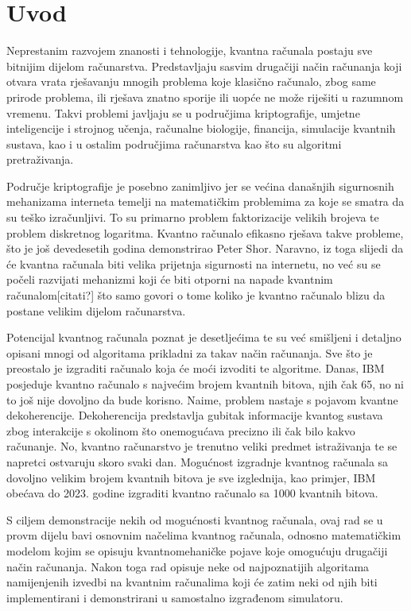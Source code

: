 \chapter{Uvod}
\label{ch:uvod}
Neprestanim razvojem znanosti i tehnologije, kvantna računala postaju sve bitnijim dijelom računarstva. Predstavljaju sasvim drugačiji način računanja koji otvara vrata rješavanju mnogih problema koje klasično računalo, zbog same prirode problema, ili rješava znatno sporije ili uopće ne može riješiti u razumnom vremenu. Takvi problemi javljaju se u područjima kriptografije, umjetne inteligencije i strojnog učenja, računalne biologije, financija, simulacije kvantnih sustava, kao i u ostalim područjima računarstva kao što su algoritmi pretraživanja.

Područje kriptografije je posebno zanimljivo jer se većina današnjih sigurnosnih mehanizama interneta temelji na matematičkim problemima za koje se smatra da su teško izračunljivi. To su primarno problem faktorizacije velikih brojeva te problem diskretnog logaritma. Kvantno računalo efikasno rješava takve probleme, što je još devedesetih godina demonstrirao Peter Shor\citep{Shor:1994jg}. Naravno, iz toga slijedi da će kvantna računala biti velika prijetnja sigurnosti na internetu, no već su se počeli razvijati mehanizmi koji će biti otporni na napade kvantnim računalom[citati?] što  samo govori o tome koliko je kvantno računalo blizu da postane velikim dijelom računarstva.

Potencijal kvantnog računala poznat je desetljećima te su već smišljeni i detaljno opisani mnogi od algoritama prikladni za takav način računanja. Sve što je preostalo je izgraditi računalo koja će moći izvoditi te algoritme. Danas, IBM posjeduje kvantno računalo s najvećim brojem kvantnih bitova, njih čak 65, no ni to još nije dovoljno da bude korisno. Naime, problem nastaje s pojavom kvantne dekoherencije. Dekoherencija predstavlja gubitak informacije kvantog sustava zbog interakcije s okolinom što onemogućava precizno ili čak bilo kakvo računanje. No, kvantno računarstvo je trenutno veliki predmet istraživanja te se napretci ostvaruju skoro svaki dan. Mogućnost izgradnje kvantnog računala sa dovoljno velikim brojem kvantnih bitova je sve izglednija, kao primjer, IBM obećava do 2023. godine izgraditi kvantno računalo sa 1000 kvantnih bitova\citep{ibm:quantum}.

S ciljem demonstracije nekih od mogućnosti kvantnog računala, ovaj rad se u provm dijelu bavi osnovnim načelima kvantnog računala, odnosno matematičkim modelom kojim se opisuju kvantnomehaničke pojave koje omogućuju drugačiji način računanja. Nakon toga rad opisuje neke od najpoznatijih algoritama namijenjenih izvedbi na kvantnim računalima koji će zatim neki od njih biti implementirani i demonstrirani u samostalno izgrađenom simulatoru.